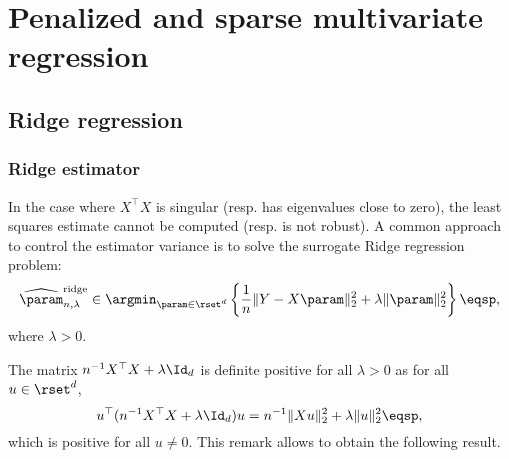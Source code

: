 \chapter{Penalized and sparse multivariate regression}
\minitoc


\section{Ridge regression}
\subsection{Ridge estimator}
In the case where $X^\top X$ is singular (resp. has eigenvalues close to zero), the least squares estimate cannot be computed (resp. is not robust). A common approach to control the estimator variance is to solve the surrogate Ridge regression problem:
\[
\widehat \param^{\mathrm{ridge}}_{n,\lambda}\in  \argmin_{\param\in\rset^d}  \left\{\frac{1}{n}\|Y - X\param\|_2^2 + \lambda\|\param\|_2^2\right\}\eqsp,
\]
where $\lambda>0$. 
\begin{remark}
The matrix $n^{-1}X^\top X + \lambda  \Id_d$ is definite positive for all $\lambda>0$ as for all $u\in\rset^d$,
\[
u^\top (n^{-1}X^\top X + \lambda \Id_d)u = n^{-1}\|Xu\|_2^2 + \lambda  \|u\|_2^2\eqsp,
\]
which is positive for all $u\neq 0$. This remark allows to obtain the following result.
\end{remark}

